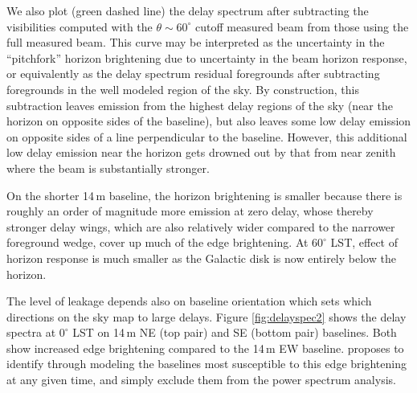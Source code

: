 \documentclass[preprint]{aastex}
\begin{document}
We also plot (green dashed line) the delay spectrum after subtracting the visibilities computed with the $\theta\sim60^\circ$ cutoff measured beam from those using the full measured beam. This curve may be interpreted as the uncertainty in the ``pitchfork'' horizon brightening due to uncertainty in the beam horizon response, or equivalently as the delay spectrum residual foregrounds after subtracting foregrounds in the well modeled region of the sky. By construction, this subtraction leaves emission from the highest delay regions of the sky (near the horizon on opposite sides of the baseline), but also leaves some low delay emission on opposite sides of a line perpendicular to the baseline. However, this additional low delay emission near the horizon gets drowned out by that from near zenith where the beam is substantially stronger. 

On the shorter 14\,m baseline, the horizon brightening is smaller because there is roughly an order of magnitude more emission at zero delay, whose thereby stronger delay wings, which are also relatively wider compared to the narrower foreground wedge, cover up much of the edge brightening. At $60^\circ$ LST, effect of horizon response is much smaller as the Galactic disk is now entirely below the horizon. 

The level of leakage depends also on baseline orientation which sets which directions on the sky map to large delays. Figure \ref{fig:delayspec2} shows the delay spectra at $0^\circ$ LST on 14\,m NE (top pair) and SE (bottom pair) baselines. Both show increased edge brightening compared to the 14\,m EW baseline. \citet{nithya15} proposes to identify through modeling the baselines most susceptible to this edge brightening at any given time, and simply exclude them from the power spectrum analysis. 
\end{document}
